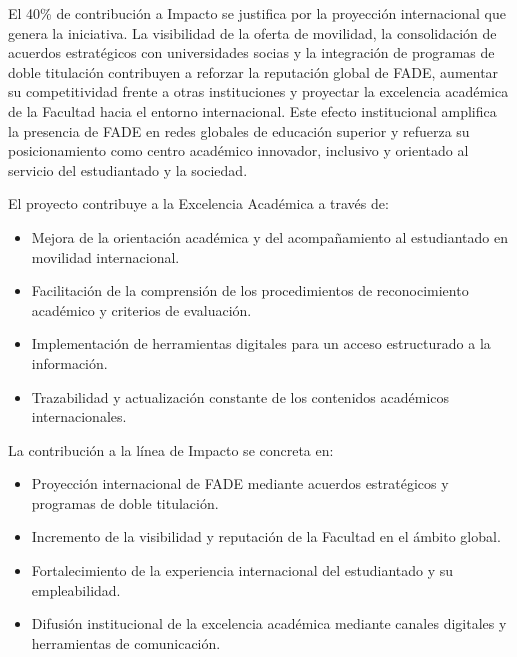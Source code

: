 \documentclass[11pt,a4paper]{scrreprt}
\begin{document}
El 40\% de contribución a Impacto se justifica por la proyección internacional que genera la iniciativa. La visibilidad de la oferta de movilidad, la consolidación de acuerdos estratégicos con universidades socias y la integración de programas de doble titulación contribuyen a reforzar la reputación global de FADE, aumentar su competitividad frente a otras instituciones y proyectar la excelencia académica de la Facultad hacia el entorno internacional. Este efecto institucional amplifica la presencia de FADE en redes globales de educación superior y refuerza su posicionamiento como centro académico innovador, inclusivo y orientado al servicio del estudiantado y la sociedad.



\small
El proyecto contribuye a la Excelencia Académica a través de:

\begin{itemize}[noitemsep,topsep=2pt]
\item Mejora de la orientación académica y del acompañamiento al estudiantado en movilidad internacional.
\item Facilitación de la comprensión de los procedimientos de reconocimiento académico y criterios de evaluación.
\item Implementación de herramientas digitales para un acceso estructurado a la información.
\item Trazabilidad y actualización constante de los contenidos académicos internacionales.
\end{itemize}



\small
La contribución a la línea de Impacto se concreta en:

\begin{itemize}[noitemsep,topsep=2pt]
\item Proyección internacional de FADE mediante acuerdos estratégicos y programas de doble titulación.
\item Incremento de la visibilidad y reputación de la Facultad en el ámbito global.
\item Fortalecimiento de la experiencia internacional del estudiantado y su empleabilidad.
\item Difusión institucional de la excelencia académica mediante canales digitales y herramientas de comunicación.
\end{itemize}
\end{document}
